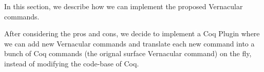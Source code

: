 



In this section, we describe how we can implement the proposed Vernacular commands.

After considering the pros and cons, we decide to implement a Coq Plugin where we can add new Vernacular commands and translate each new command into a bunch of Coq commands (the orignal surface Vernacular command) on the fly, instead of modifying the code-base of Coq. 

